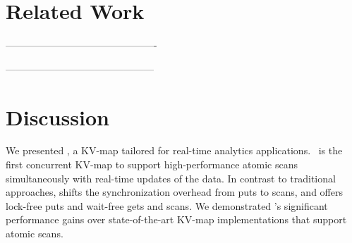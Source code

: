 \documentclass[acmsmall, review]{acmart}
\begin{document}
\renewcommand{\thefootnote}{\arabic{footnote}}



\section{Related Work}
\label{sec:related}




----------------------------------------------

---------------------------------------------


\section{Discussion}
\label{sec:disc}

We presented {\kiwi}, a KV-map tailored for real-time analytics applications. \kiwi\ is the first
concurrent KV-map to support high-performance atomic scans simultaneously with real-time updates of the data.
In contrast to traditional approaches, {\kiwi} shifts the synchronization
overhead from puts to scans, and offers lock-free puts and wait-free gets and scans.
We demonstrated {\kiwi}'s significant performance gains over state-of-the-art KV-map
implementations that support atomic scans. 




%
%
\appendix

\end{document}
